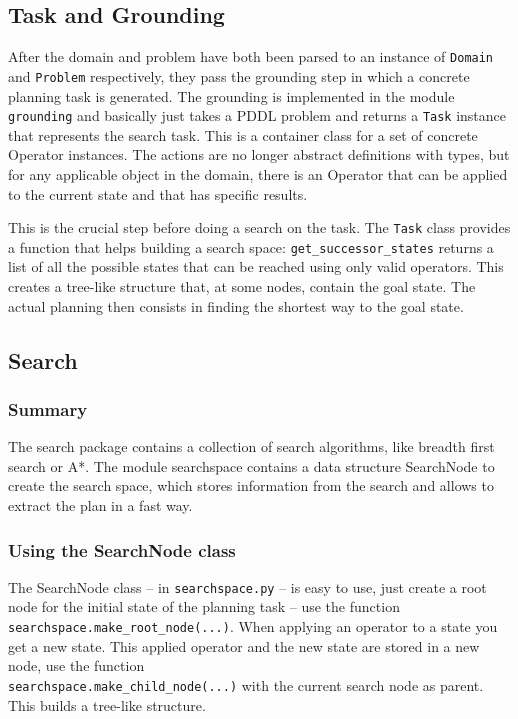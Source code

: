 \documentclass{article}
\begin{document}
\hypertarget{toc7}{}
\subsection{Task and Grounding}

After the domain and problem have both been parsed to an instance of \texttt{Domain}
and \texttt{Problem} respectively, they pass the grounding step in which a concrete
planning task is generated. The grounding is implemented in the module
\texttt{grounding} and basically just takes a PDDL problem and returns a \texttt{Task}
instance that represents the search task. This is a container class for a set
of concrete Operator instances. The actions are no longer abstract definitions
with types, but for any applicable object in the domain, there is an Operator
that can be applied to the current state and that has specific results.

This is the crucial step before doing a search on the task. The \texttt{Task} class
provides a function that helps building a search space: \texttt{get\_successor\_states}
returns a list of all the possible states that can be reached using only valid
operators. This creates a tree-like structure that, at some nodes, contain the
goal state. The actual planning then consists in finding the shortest way to
the goal state.

\hypertarget{toc8}{}
\subsection{Search}

\hypertarget{toc9}{}
\subsubsection{Summary}

The search package contains a collection of search algorithms, like
breadth first search or A*. The module searchspace contains a data
structure SearchNode to create the search space, which stores
information from the search and allows to extract the plan in a
fast way.

\hypertarget{toc10}{}
\subsubsection{Using the SearchNode class}

The SearchNode class -- in \texttt{searchspace.py} -- is easy to use, just create a
root node for the initial state of the planning task -- use the function\\
\texttt{searchspace.make\_root\_node(...)}. When applying an operator to a
state you get a new state. This applied operator and the new
state are stored in a new node, use the function\\
\texttt{searchspace.make\_child\_node(...)}
with the current search node as parent. This builds a tree-like structure.
\end{document}

